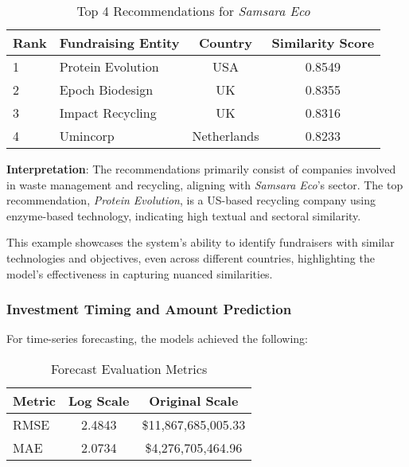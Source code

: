\documentclass[sigconf]{acmart}
\begin{document}
\begin{table}[htpb]
    \centering
    \caption{Top 4 Recommendations for \textit{Samsara Eco}}
    \label{tab:recommendations_example}
    \begin{tabular}{llcc}
        \toprule
        \textbf{Rank} & \textbf{Fundraising Entity} & \textbf{Country} & \textbf{Similarity Score} \\
        \midrule
        1 & Protein Evolution & USA & 0.8549 \\
        2 & Epoch Biodesign & UK & 0.8355 \\
        3 & Impact Recycling & UK & 0.8316 \\
        4 & Umincorp & Netherlands & 0.8233 \\
        \bottomrule
    \end{tabular}
\end{table}

\textbf{Interpretation}: The recommendations primarily consist of companies involved in waste management and recycling, aligning with \textit{Samsara Eco}'s sector. The top recommendation, \textit{Protein Evolution}, is a US-based recycling company using enzyme-based technology, indicating high textual and sectoral similarity.

This example showcases the system's ability to identify fundraisers with similar technologies and objectives, even across different countries, highlighting the model's effectiveness in capturing nuanced similarities.

\subsubsection{Investment Timing and Amount Prediction}

For time-series forecasting, the models achieved the following:

\begin{table}[htpb]
    \centering
    \caption{Forecast Evaluation Metrics}
    \label{tab:forecast_metrics}
    \begin{tabular}{lcc}
        \toprule
        Metric & Log Scale & Original Scale \\
        \midrule
        RMSE & 2.4843 & \$11,867,685,005.33 \\
        MAE & 2.0734 & \$4,276,705,464.96 \\
        \bottomrule
    \end{tabular}
\end{table}
\end{document}
